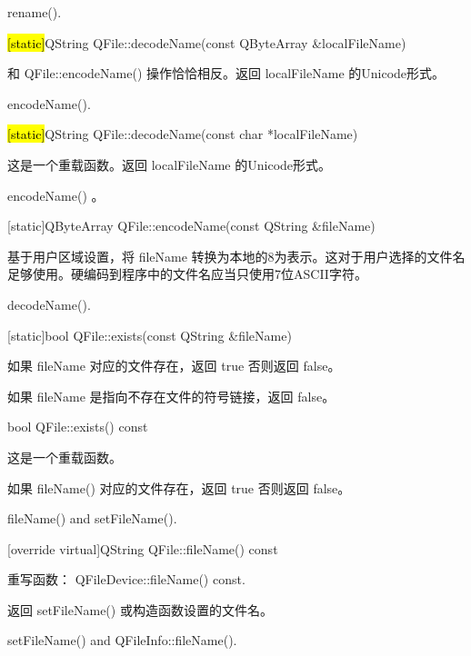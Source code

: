 \begin{notice}[另请参阅]
rename().
\end{notice} 

\hl{[static]}QString QFile::decodeName(const QByteArray \&localFileName)

和 QFile::encodeName() 操作恰恰相反。返回 localFileName 的Unicode形式。


\begin{notice}[另请参阅]
encodeName().
\end{notice} 

\hl{[static]}QString QFile::decodeName(const char *localFileName)

这是一个重载函数。返回 localFileName 的Unicode形式。


\begin{notice}[另请参阅]
 encodeName() 。
\end{notice} 


[static]QByteArray QFile::encodeName(const QString \&fileName)

基于用户区域设置，将 fileName 转换为本地的8为表示。这对于用户选择的文件名足够使用。硬编码到程序中的文件名应当只使用7位ASCII字符。


\begin{notice}[另请参阅]
decodeName().
\end{notice} 

[static]bool QFile::exists(const QString \&fileName)

如果 fileName 对应的文件存在，返回 true 否则返回 false。



\begin{notice}
如果 fileName 是指向不存在文件的符号链接，返回 false。
\end{notice} 

bool QFile::exists() const

这是一个重载函数。

如果 fileName() 对应的文件存在，返回 true 否则返回 false。



\begin{notice}[另请参阅]
fileName() and setFileName().
\end{notice} 

[override virtual]QString QFile::fileName() const

重写函数： QFileDevice::fileName() const.

返回 setFileName() 或构造函数设置的文件名。


\begin{notice}[另请参阅]
setFileName() and QFileInfo::fileName().
\end{notice} 

